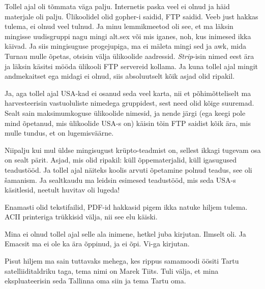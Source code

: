 
Tollel ajal oli tõmmata väga palju. Internetis paska veel ei olnud ja häid materjale oli palju. Ülikoolidel olid gopher-i saidid, FTP saidid. Veeb just hakkas tulema, ei olnud veel tulnud. Ja minu lemmikmeetod oli see, et ma läksin mingisse uudisgruppi nagu mingi alt.sex või mis iganes, noh, kus inimesed ikka käivad. Ja siis mingisuguse progejupiga, ma ei mäleta mingi sed ja awk, mida Turnau mulle õpetas, otsisin välja  ülikoolide aadressid. \emph{Strip}-isin nimed eest ära ja läksin käsitsi mööda ülikooli FTP servereid kollama. Ja kuna tollel ajal mingit andmekaitset ega midagi ei olnud, siis absoluutselt kõik asjad olid ripakil. 


Ja, aga tollel ajal USA-kad ei osanud seda veel karta, nii et põhimõtteliselt ma harvesteerisin vastuoluliste nimedega gruppidest, sest need olid kõige suuremad. Sealt sain maksimumkoguse ülikoolide nimesid, ja nende järgi (ega keegi pole mind õpetanud, mis ülikoolide USA-s on) käisin tõin FTP saidist kõik  ära, mis mulle tundus, et on lugemisväärne.


Niipalju kui mul üldse mingisugust krüpto-teadmist on, sellest ikkagi tugevam osa on sealt pärit. Asjad, mis olid ripakil: küll õppematerjalid, küll igasugused teadustööd. Ja tollel ajal näiteks koolis arvuti õpetamine polnud teadus, see oli šamanism. Ja sealtkaudu ma leidsin esimesed teadustööd, mis seda USA-s käsitlesid, neetult huvitav oli lugeda! 


Enamasti olid tekstifailid, PDF-id hakkasid pigem ikka natuke hiljem tulema. ACII printeriga trükkisid välja, nii see elu käiski. 


Mina ei olnud tollel ajal selle ala inimene, hetkel juba kirjutan. Ilmselt oli. Ja Emacsit ma ei ole ka ära õppinud, ja ei õpi. Vi-ga kirjutan. 

Pisut hiljem ma sain tuttavaks mehega, kes rippus samamoodi öösiti Tartu satelliiditaldriku taga, tema nimi on Marek Tiits. Tuli välja, et mina ekspluateerisin  seda Tallinna oma siin ja tema Tartu oma. 

